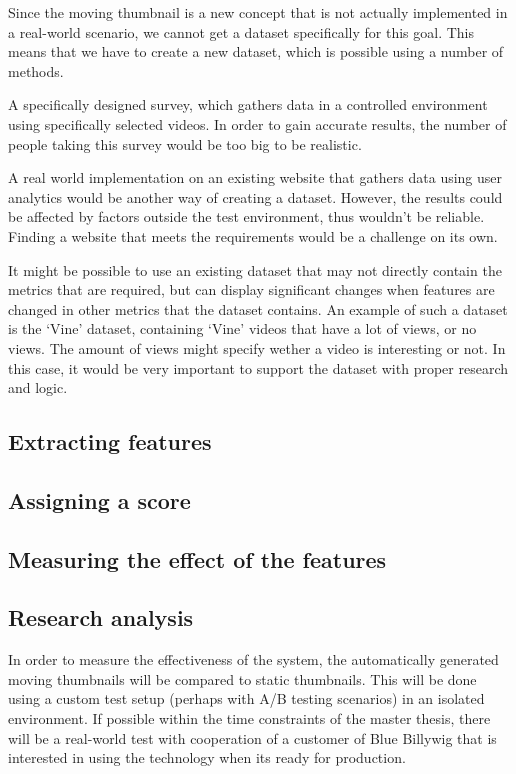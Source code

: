 \documentclass{../resources/acm_proc_article-sp}
\begin{document}
Since the moving thumbnail is a new concept that is not actually implemented in a real-world scenario, we cannot get a dataset specifically for this goal. This means that we have to create a new dataset, which is possible using a number of methods.

A specifically designed survey, which gathers data in a controlled environment using specifically selected videos. In order to gain accurate results, the number of people taking this survey would be too big to be realistic.

A real world implementation on an existing website that gathers data using user analytics would be another way of creating a dataset. However, the results could be affected by factors outside the test environment, thus wouldn't be reliable. Finding a website that meets the requirements would be a challenge on its own.

It might be possible to use an existing dataset that may not directly contain the metrics that are required, but can display significant changes when features are changed in other metrics that the dataset contains. An example of such a dataset is the `Vine' dataset, containing `Vine' videos that have a lot of views, or no views. The amount of views might specify wether a video is interesting or not. In this case, it would be very important to support the dataset with proper research and logic.

\subsection{Extracting features}


\subsection{Assigning a score}


\subsection{Measuring the effect of the features}



\subsection{Research analysis}

In order to measure the effectiveness of the system, the automatically generated moving thumbnails will be compared to static thumbnails. This will be done using a custom test setup (perhaps with A/B testing scenarios) in an isolated environment. If possible within the time constraints of the master thesis, there will be a real-world test with cooperation of a customer of Blue Billywig that is interested in using the technology when its ready for production.
\end{document}
